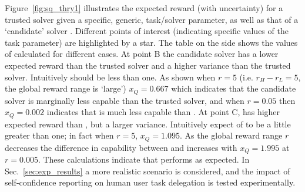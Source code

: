 %
%
Figure~\ref{fig:sq_thry1} illustrates the expected reward (with uncertainty) for a trusted solver \solvestar{} given a specific, generic, task/solver parameter, as well as that of a `candidate' solver \solve. Different points of interest (indicating specific values of the task parameter) are highlighted by a star. The table on the side shows the values of \xQ{} calculated for different cases. At point B the candidate solver has a lower expected reward than the trusted solver and a higher variance than the trusted solver. Intuitively \xQ{} should be less than one. As shown when $r=5$ (i.e. $r_H-r_L=5$, the global reward range is `large') $x_Q=0.667$ which indicates that the candidate solver is marginally less capable than the trusted solver, and when $r=0.05$ then $x_Q=0.002$ indicates that \solve{} is much less capable than \solvestar. At point C, \solve{} has higher expected reward than \solvestar, but a larger variance. Intuitively expect \xQ{} of \solve{} to be a little greater than one; in fact when $r=5$, $x_Q=1.095$. As the global reward range $r$ decreases the difference in capability between \solve{} and \solvestar{} increases with $x_Q=1.995$ at $r=0.005$. These calculations indicate that \xQ{} performs as expected. In Sec.~\ref{sec:exp_results} a more realistic scenario is considered, and the impact of self-confidence reporting on human user task delegation is tested experimentally. 

